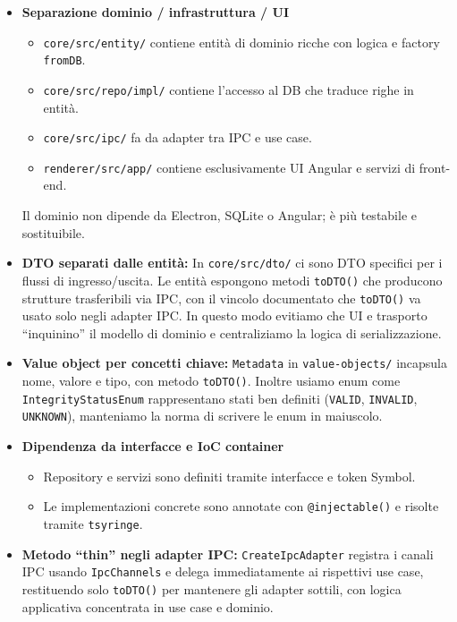 \documentclass[a4paper,12pt]{article}
\begin{document}
\begin{itemize}
  \item \textbf{Separazione dominio / infrastruttura / UI}
    \begin{itemize}
      \item \texttt{core/src/entity/} contiene entità di dominio ricche con logica e factory \texttt{fromDB}.
      \item \texttt{core/src/repo/impl/} contiene l'accesso al DB che traduce righe in entità.
      \item \texttt{core/src/ipc/} fa da adapter tra IPC e use case.
      \item \texttt{renderer/src/app/} contiene esclusivamente UI Angular e servizi di front-end.
    \end{itemize}
    Il dominio non dipende da Electron, SQLite o Angular; è più testabile e sostituibile.

  \item \textbf{DTO separati dalle entità: }In \texttt{core/src/dto/} ci sono DTO specifici per i flussi di ingresso/uscita.
    Le entità espongono metodi \texttt{toDTO()} che producono strutture trasferibili via IPC, con il vincolo documentato che \texttt{toDTO()} va usato solo negli adapter IPC.
    In questo modo evitiamo che UI e trasporto ``inquinino'' il modello di dominio e centraliziamo la logica di serializzazione.

  \item \textbf{Value object per concetti chiave: }\texttt{Metadata} in \texttt{value-objects/} incapsula nome, valore e tipo, con metodo \texttt{toDTO()}.
    Inoltre usiamo enum come \texttt{IntegrityStatusEnum} rappresentano stati ben definiti (\texttt{VALID}, \texttt{INVALID}, \texttt{UNKNOWN}), manteniamo la norma di scrivere le enum in maiuscolo.\\
  
    \item \textbf{Dipendenza da interfacce e IoC container}
    \begin{itemize}
      \item Repository e servizi sono definiti tramite interfacce e token Symbol.
      \item Le implementazioni concrete sono annotate con \texttt{@injectable()} e risolte tramite \texttt{tsyringe}.
    \end{itemize}

  \item \textbf{Metodo ``thin'' negli adapter IPC: }\texttt{CreateIpcAdapter} registra i canali IPC usando \texttt{IpcChannels} e delega immediatamente ai rispettivi use case, restituendo solo \texttt{toDTO()} per mantenere gli adapter sottili, con logica applicativa concentrata in use case e dominio.
\end{itemize}
\end{document}
